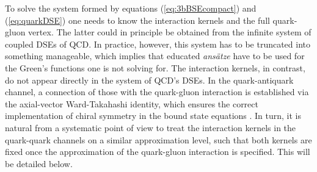 To solve the system formed by equations (\ref{eq:3bBSEcompact}) and (\ref{eq:quarkDSE}) one needs to know the interaction kernels and the full quark-gluon vertex. The latter could in principle be obtained from the infinite system of coupled DSEs of QCD. In practice, however, this system has to be truncated into something manageable, which implies that educated \textit{ans\"atze} have to be used for the Green's functions one is not solving for. The interaction kernels, in contrast, do not appear directly in the system of QCD's DSEs. 
In the quark-antiquark channel, a connection of those with the quark-gluon interaction is established
via the axial-vector Ward-Takahashi identity, which ensures the correct implementation of chiral 
symmetry in the bound state equations \cite{Munczek:1994zz,Maris:1997hd}. In turn, it is natural from
a systematic point of view to treat the interaction kernels in the quark-quark channels on a similar
approximation level, such that both kernels are fixed once the approximation of the
quark-gluon interaction is specified. This will be detailed below.


